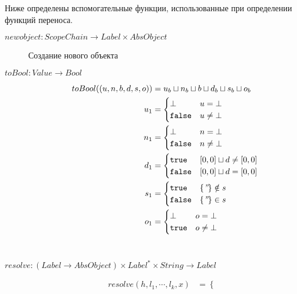 Ниже определены вспомогательные функции, использованные при
определении функций переноса.
\begin{description}
  \item[ $newobject : ScopeChain \rightarrow Label \times
    AbsObject$ ] %
  Создание нового объекта 
  \\
  \item[ $toBool : Value \rightarrow Bool$ ] %
  \[
  \begin{aligned}
    toBool( (u, n, b, d, s, o) ) &=
    u_b \sqcup n_b \sqcup b \sqcup d_b \sqcup s_b \sqcup o_b \\
    u_1 &= \begin{cases}
      \bot & u = \bot \\
      \texttt{false} & u \neq \bot \\
    \end{cases} \\ 
    n_1 &= \begin{cases}
      \bot & n = \bot \\
      \texttt{false} & n \neq \bot \\
    \end{cases} \\ 
    d_1 &= \begin{cases}
      \texttt{true} & [0, 0] \sqcup d \neq [0,0] \\
      \texttt{false} & [0, 0] \sqcup d = [0,0] \\
    \end{cases} \\ 
    s_1 &= \begin{cases}
      \texttt{true} & \{\emph{''}\} \notin s \\
      \texttt{false} & \{\emph{''}\} \in s \\
    \end{cases}\\
    o_1 &= \begin{cases}
      \bot & o = \bot \\
      \texttt{true} & o \neq \bot \\
    \end{cases} 
  \end{aligned}
  \]
  \\
  \item[ $resolve : (Label \rightarrow AbsObject) \times Label^* \times String \rightarrow Label $] %
  \[
  \begin{aligned}
    resolve(h, l_1, \cdots, l_k, x) &= \begin{cases}

\end{cases}
\end{aligned}\]
\end{description}
